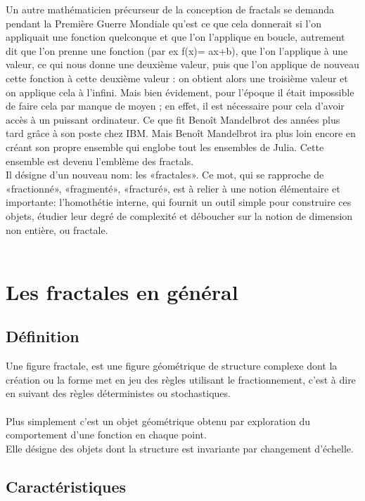 \documentclass[a4paper]{article}
\begin{document}
Un autre mathématicien précurseur de la conception de fractals se demanda pendant la Première Guerre Mondiale qu’est ce que cela donnerait si l’on appliquait une fonction quelconque et que l’on l’applique en boucle, autrement dit que l’on prenne une fonction (par ex f(x)= ax+b), que l’on l’applique à une valeur, ce qui nous donne une deuxième valeur, puis que l’on applique de nouveau cette fonction à cette deuxième valeur : on obtient alors une troisième valeur et on applique cela à l’infini. Mais bien évidement, pour l’époque il était impossible de faire cela par manque de moyen ; en effet, il est nécessaire pour cela d’avoir accès à un puissant ordinateur. Ce que fit Benoît Mandelbrot des années plus tard grâce à son poste chez IBM. Mais Benoît Mandelbrot ira plus loin encore en créant son propre ensemble qui englobe tout les ensembles de Julia. Cette ensemble est devenu l’emblème des fractals.\\

Il désigne d'un nouveau nom: les «fractales». Ce mot, qui se rapproche de «fractionné», «fragmenté», «fracturé», est à relier à une notion élémentaire et importante: l'homothétie interne, qui fournit un outil simple pour construire ces objets, étudier leur degré de complexité et déboucher sur la notion de dimension non entière, ou fractale. \\\\

\newpage
\section{Les fractales en général}
\subsection{Définition}
Une figure fractale, est une figure géométrique de structure complexe dont la création ou la forme met en jeu des règles utilisant le fractionnement, c'est à dire en suivant des règles déterministes ou stochastiques.\\\\
Plus simplement c'est un objet géométrique obtenu par exploration du comportement d'une fonction en chaque point. \\
Elle désigne des objets dont la structure est invariante par changement d'échelle. \\

\subsection{Caractéristiques}
\end{document}
